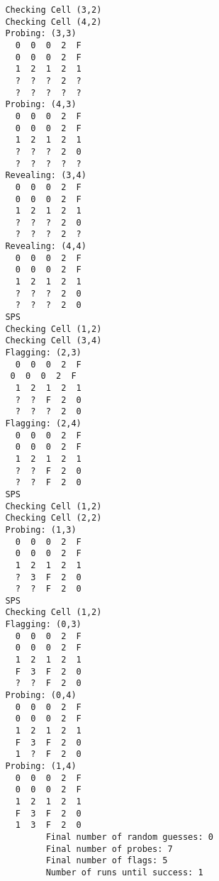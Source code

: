 \documentclass[british]{article}
\begin{document}
\begin{lstlisting}
               Checking Cell (3,2)
               Checking Cell (4,2)
               Probing: (3,3)
                 0  0  0  2  F
                 0  0  0  2  F
                 1  2  1  2  1
                 ?  ?  ?  2  ?
                 ?  ?  ?  ?  ?
               Probing: (4,3)
                 0  0  0  2  F
                 0  0  0  2  F
                 1  2  1  2  1
                 ?  ?  ?  2  0
                 ?  ?  ?  ?  ?
               Revealing: (3,4)
                 0  0  0  2  F
                 0  0  0  2  F
                 1  2  1  2  1
                 ?  ?  ?  2  0
                 ?  ?  ?  2  ?
               Revealing: (4,4)
                 0  0  0  2  F
                 0  0  0  2  F
                 1  2  1  2  1
                 ?  ?  ?  2  0
                 ?  ?  ?  2  0
               SPS
               Checking Cell (1,2)
               Checking Cell (3,4)
               Flagging: (2,3)
                 0  0  0  2  F
                0  0  0  2  F
                 1  2  1  2  1
                 ?  ?  F  2  0
                 ?  ?  ?  2  0
               Flagging: (2,4)
                 0  0  0  2  F
                 0  0  0  2  F
                 1  2  1  2  1
                 ?  ?  F  2  0
                 ?  ?  F  2  0
               SPS
               Checking Cell (1,2)
               Checking Cell (2,2)
               Probing: (1,3)
                 0  0  0  2  F
                 0  0  0  2  F
                 1  2  1  2  1
                 ?  3  F  2  0
                 ?  ?  F  2  0
               SPS
               Checking Cell (1,2)
               Flagging: (0,3)
                 0  0  0  2  F
                 0  0  0  2  F
                 1  2  1  2  1
                 F  3  F  2  0
                 ?  ?  F  2  0
               Probing: (0,4)
                 0  0  0  2  F
                 0  0  0  2  F
                 1  2  1  2  1
                 F  3  F  2  0
                 1  ?  F  2  0
               Probing: (1,4)
                 0  0  0  2  F
                 0  0  0  2  F
                 1  2  1  2  1
                 F  3  F  2  0
                 1  3  F  2  0
                       Final number of random guesses: 0
                       Final number of probes: 7
                       Final number of flags: 5
                       Number of runs until success: 1
\end{lstlisting}
\end{document}
